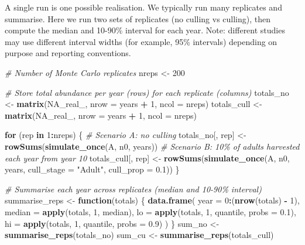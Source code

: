 \documentclass[
  a4paper]{book}
\newenvironment{Shaded}{\begin{snugshade}}{\end{snugshade}}
\newcommand{\AttributeTok}[1]{\textcolor[rgb]{0.13,0.29,0.53}{#1}}
\newcommand{\CommentTok}[1]{\textcolor[rgb]{0.56,0.35,0.01}{\textit{#1}}}
\newcommand{\ConstantTok}[1]{\textcolor[rgb]{0.56,0.35,0.01}{#1}}
\newcommand{\ControlFlowTok}[1]{\textcolor[rgb]{0.13,0.29,0.53}{\textbf{#1}}}
\newcommand{\DecValTok}[1]{\textcolor[rgb]{0.00,0.00,0.81}{#1}}
\newcommand{\FloatTok}[1]{\textcolor[rgb]{0.00,0.00,0.81}{#1}}
\newcommand{\FunctionTok}[1]{\textcolor[rgb]{0.13,0.29,0.53}{\textbf{#1}}}
\newcommand{\NormalTok}[1]{#1}
\newcommand{\OtherTok}[1]{\textcolor[rgb]{0.56,0.35,0.01}{#1}}
\newcommand{\SpecialCharTok}[1]{\textcolor[rgb]{0.81,0.36,0.00}{\textbf{#1}}}
\newcommand{\StringTok}[1]{\textcolor[rgb]{0.31,0.60,0.02}{#1}}
\begin{document}
A single run is one possible realisation. We typically run many replicates and summarise.
Here we run two sets of replicates (no culling vs culling), then compute the median and 10-90\% interval for each year.
Note: different studies may use different interval widths (for example, 95\% intervals) depending on purpose and reporting conventions.

\begin{Shaded}
\begin{Highlighting}[]
\CommentTok{\# Number of Monte Carlo replicates}
\NormalTok{nreps }\OtherTok{\textless{}{-}} \DecValTok{200}

\CommentTok{\# Store total abundance per year (rows) for each replicate (columns)}
\NormalTok{totals\_no }\OtherTok{\textless{}{-}} \FunctionTok{matrix}\NormalTok{(}\ConstantTok{NA\_real\_}\NormalTok{, }\AttributeTok{nrow =}\NormalTok{ years }\SpecialCharTok{+} \DecValTok{1}\NormalTok{, }\AttributeTok{ncol =}\NormalTok{ nreps)}
\NormalTok{totals\_cull }\OtherTok{\textless{}{-}} \FunctionTok{matrix}\NormalTok{(}\ConstantTok{NA\_real\_}\NormalTok{, }\AttributeTok{nrow =}\NormalTok{ years }\SpecialCharTok{+} \DecValTok{1}\NormalTok{, }\AttributeTok{ncol =}\NormalTok{ nreps)}

\ControlFlowTok{for}\NormalTok{ (rep }\ControlFlowTok{in} \DecValTok{1}\SpecialCharTok{:}\NormalTok{nreps) \{}
  \CommentTok{\# Scenario A: no culling}
\NormalTok{  totals\_no[, rep] }\OtherTok{\textless{}{-}} \FunctionTok{rowSums}\NormalTok{(}\FunctionTok{simulate\_once}\NormalTok{(A, n0, years))}
  \CommentTok{\# Scenario B: 10\% of adults harvested each year from year 10}
\NormalTok{  totals\_cull[, rep] }\OtherTok{\textless{}{-}} \FunctionTok{rowSums}\NormalTok{(}\FunctionTok{simulate\_once}\NormalTok{(A, n0, years,}
                                              \AttributeTok{cull\_stage =} \StringTok{"Adult"}\NormalTok{,}
                                              \AttributeTok{cull\_prop =} \FloatTok{0.1}\NormalTok{))}
\NormalTok{\}}

\CommentTok{\# Summarise each year across replicates (median and 10{-}90\% interval)}
\NormalTok{summarise\_reps }\OtherTok{\textless{}{-}} \ControlFlowTok{function}\NormalTok{(totals) \{}
  \FunctionTok{data.frame}\NormalTok{(}
    \AttributeTok{year =} \DecValTok{0}\SpecialCharTok{:}\NormalTok{(}\FunctionTok{nrow}\NormalTok{(totals) }\SpecialCharTok{{-}} \DecValTok{1}\NormalTok{),}
    \AttributeTok{median =} \FunctionTok{apply}\NormalTok{(totals, }\DecValTok{1}\NormalTok{, median),}
    \AttributeTok{lo =} \FunctionTok{apply}\NormalTok{(totals, }\DecValTok{1}\NormalTok{, quantile, }\AttributeTok{probs =} \FloatTok{0.1}\NormalTok{),}
    \AttributeTok{hi =} \FunctionTok{apply}\NormalTok{(totals, }\DecValTok{1}\NormalTok{, quantile, }\AttributeTok{probs =} \FloatTok{0.9}\NormalTok{)}
\NormalTok{  )}
\NormalTok{\}}
\NormalTok{sum\_no }\OtherTok{\textless{}{-}} \FunctionTok{summarise\_reps}\NormalTok{(totals\_no)}
\NormalTok{sum\_cu }\OtherTok{\textless{}{-}} \FunctionTok{summarise\_reps}\NormalTok{(totals\_cull)}


\end{Highlighting}
\end{Shaded}
\end{document}

